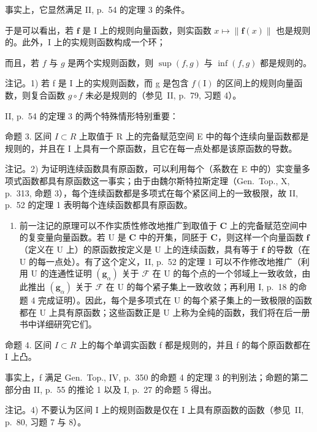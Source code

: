 事实上，它显然满足 II, p.~54 的定理 3 的条件。

于是可以看出，若 \(\mathbf{f}\) 是 I 上的规则向量函数，则实函数 \(x\mapsto \| \mathbf{f}(x)\|\) 也是规则的。此外，I 上的实规则函数构成一个环；

而且，若 \(f\) 与 \(g\) 是两个实规则函数，则 \(\sup(f, g)\) 与 \(\inf(f, g)\) 都是规则的。

注记。1) 若 f 是 I 上的实规则函数，而 g 是包含 \(f(\mathrm{I})\) 的区间上的规则向量函数，则复合函数 \(g \circ f\) 未必是规则的（参见~II, p.~79, 习题 4）。

II, p.~54 的定理 3 的两个特殊情形特别重要：

命题 3. 区间 \(I \subset R\) 上取值于 R 上的完备赋范空间 E 中的每个连续向量函数都是规则的，并且在 I 上具有一个原函数，且它在每一点处都是该原函数的导数。

注记。2) 为证明连续函数具有原函数，可以利用每个（系数在 E 中的）实变量多项式函数都具有原函数这一事实；由于由魏尔斯特拉斯定理（Gen.~Top., X, p.~313, 命题 3），每个连续函数都是多项式在每个紧区间上的一致极限，故 II, p.~52 的定理 1 表明每个连续函数都具有原函数。

\begin{enumerate}
\def\labelenumi{\arabic{enumi})}
\setcounter{enumi}{2}
\tightlist
\item
  前一注记的原理可以不作实质性修改地推广到取值于 \(\mathbf{C}\) 上的完备赋范空间中的复变量向量函数。若 \(\mathrm{U}\) 是 \(\mathbf{C}\) 中的开集，同胚于 \(\mathbf{C}\)，则这样一个向量函数 \(\mathbf{f}\)（定义在 \(\mathrm{U}\) 上）的原函数按定义是 \(\mathrm{U}\) 上的连续函数，具有等于 \(\mathbf{f}\) 的导数（在 \(\mathrm{U}\) 的每一点处）。有了这个定义，II, p.~52 的定理 1 可以不作修改地推广（利用 \(\mathrm{U}\) 的连通性证明 \((\mathbf{g}_{\alpha})\) 关于 \(\mathcal{F}\) 在 \(\mathrm{U}\) 的每个点的一个邻域上一致收敛，由此推出 \((\mathbf{g}_{\alpha})\) 关于 \(\mathcal{F}\) 在 \(\mathrm{U}\) 的每个紧子集上一致收敛；再利用 I, p.~18 的命题 4 完成证明）。因此，每个是多项式在 \(\mathrm{U}\) 的每个紧子集上的一致极限的函数都在 \(\mathrm{U}\) 上具有原函数；这些函数正是 \(\mathrm{U}\) 上称为全纯的函数，我们将在后一册书中详细研究它们。
\end{enumerate}

命题 4. 区间 \(I \subset R\) 上的每个单调实函数 f 都是规则的，并且 f 的每个原函数都在 I 上凸。

事实上，f 满足 Gen.~Top., IV, p.~350 的命题 4 的定理 3 的判别法；命题的第二部分由 II, p.~55 的推论 1 以及 I, p.~27 的命题 5 得出。

注记。4) 不要认为区间 I 上的规则函数是仅在 I 上具有原函数的函数（参见~II, p.~80, 习题 7 与 8）。


